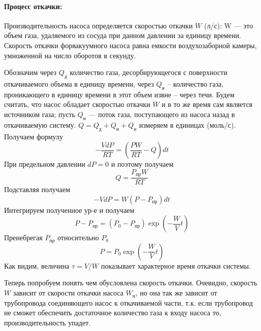 \documentclass[a4paper, 12pt]{article}
\begin{document}
    \paragraph{Процесс откачки: }
    Производительность насоса определяется скоростью откачки $W$ (л/с): W — это объем газа, удаляемого из сосуда при данном давлении за единицу времени. Скорость откачки форвакуумного насоса равна емкости воздухозаборной камеры, умноженной на число оборотов в секунду.

    Обозначим через $Q_д$ количество газа, десорбирующегося с поверхности откачиваемого объема в единицу времени, через $Q_и$ -- количество газа, проникающего в единицу времени в этот объем извне -- через течи. Будем считать, что насос обладает скоростью откачки $W$ и в то же время сам является источником газа; пусть $Q_н$ — поток газа, поступающего из насоса назад в откачиваемую систему. $Q=Q_д + Q_и + Q_н$ измеряем в единицах (моль/с). Получаем формулу
    \begin{equation*}
        -\frac{VdP}{RT}=\left(\frac{PW}{RT} - Q\right)dt
    \end{equation*}
    При предельном давлении $dP=0$ и поэтому получаем
    \begin{equation*}
        Q=\frac{P_{пр}W}{RT}
    \end{equation*}
    Подставляя получаем
    \begin{equation*}
        -VdP=W(P-P_{пр})dt
    \end{equation*}
    Интегрируем полученное ур-е и получаем
    \begin{equation}
        P-P_{пр}=(P_0 - P_{пр})\exp\left(-\frac{W}{V}t\right)
    \end{equation}
    Пренебрегая $P_{пр}$ относительно $P_0$
    \begin{equation}
        P=P_0\exp\left(-\frac{W}{V}t\right) \label{W}
    \end{equation}
    Как видим, величина $\tau=V/W$ показывает характерное время откачки системы.

    Теперь попробуем понять чем обусловлена скорость откачки. Очевидно, скорость $W$ зависит от скорости откачки насоса $W_н$, но она так же зависит от трубопровода соединяющего насос к откачиваемой части, т.к. если трубопровод не сможет обеспечить достаточное количество газа к входу насоса то, производительность упадет.
\end{document}
